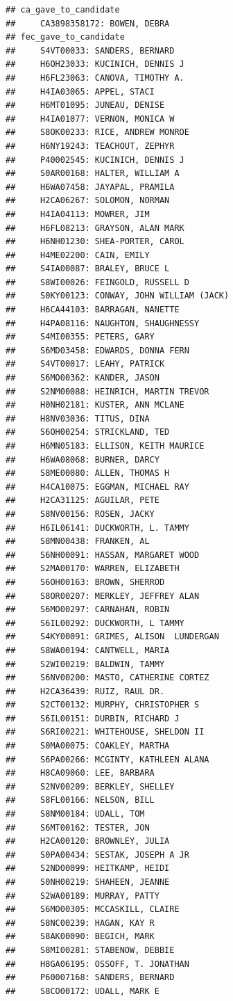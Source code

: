 \documentclass[]{book}
\begin{document}
\begin{verbatim}
## ca_gave_to_candidate 
##     CA3898358172: BOWEN, DEBRA
## fec_gave_to_candidate 
##     S4VT00033: SANDERS, BERNARD
##     H6OH23033: KUCINICH, DENNIS J
##     H6FL23063: CANOVA, TIMOTHY A.
##     H4IA03065: APPEL, STACI
##     H6MT01095: JUNEAU, DENISE
##     H4IA01077: VERNON, MONICA W
##     S8OK00233: RICE, ANDREW MONROE
##     H6NY19243: TEACHOUT, ZEPHYR
##     P40002545: KUCINICH, DENNIS J
##     S0AR00168: HALTER, WILLIAM A
##     H6WA07458: JAYAPAL, PRAMILA
##     H2CA06267: SOLOMON, NORMAN
##     H4IA04113: MOWRER, JIM
##     H6FL08213: GRAYSON, ALAN MARK
##     H6NH01230: SHEA-PORTER, CAROL
##     H4ME02200: CAIN, EMILY
##     S4IA00087: BRALEY, BRUCE L
##     S8WI00026: FEINGOLD, RUSSELL D
##     S0KY00123: CONWAY, JOHN WILLIAM (JACK)
##     H6CA44103: BARRAGAN, NANETTE
##     H4PA08116: NAUGHTON, SHAUGHNESSY
##     S4MI00355: PETERS, GARY
##     S6MD03458: EDWARDS, DONNA FERN
##     S4VT00017: LEAHY, PATRICK
##     S6MO00362: KANDER, JASON
##     S2NM00088: HEINRICH, MARTIN TREVOR
##     H0NH02181: KUSTER, ANN MCLANE
##     H8NV03036: TITUS, DINA
##     S6OH00254: STRICKLAND, TED
##     H6MN05183: ELLISON, KEITH MAURICE
##     H6WA08068: BURNER, DARCY
##     S8ME00080: ALLEN, THOMAS H
##     H4CA10075: EGGMAN, MICHAEL RAY
##     H2CA31125: AGUILAR, PETE
##     S8NV00156: ROSEN, JACKY
##     H6IL06141: DUCKWORTH, L. TAMMY
##     S8MN00438: FRANKEN, AL
##     S6NH00091: HASSAN, MARGARET WOOD
##     S2MA00170: WARREN, ELIZABETH
##     S6OH00163: BROWN, SHERROD
##     S8OR00207: MERKLEY, JEFFREY ALAN
##     S6MO00297: CARNAHAN, ROBIN
##     S6IL00292: DUCKWORTH, L TAMMY
##     S4KY00091: GRIMES, ALISON  LUNDERGAN
##     S8WA00194: CANTWELL, MARIA
##     S2WI00219: BALDWIN, TAMMY
##     S6NV00200: MASTO, CATHERINE CORTEZ
##     H2CA36439: RUIZ, RAUL DR.
##     S2CT00132: MURPHY, CHRISTOPHER S
##     S6IL00151: DURBIN, RICHARD J
##     S6RI00221: WHITEHOUSE, SHELDON II
##     S0MA00075: COAKLEY, MARTHA
##     S6PA00266: MCGINTY, KATHLEEN ALANA
##     H8CA09060: LEE, BARBARA
##     S2NV00209: BERKLEY, SHELLEY
##     S8FL00166: NELSON, BILL
##     S8NM00184: UDALL, TOM
##     S6MT00162: TESTER, JON
##     H2CA00120: BROWNLEY, JULIA
##     S0PA00434: SESTAK, JOSEPH A JR
##     S2ND00099: HEITKAMP, HEIDI
##     S0NH00219: SHAHEEN, JEANNE
##     S2WA00189: MURRAY, PATTY
##     S6MO00305: MCCASKILL, CLAIRE
##     S8NC00239: HAGAN, KAY R
##     S8AK00090: BEGICH, MARK
##     S8MI00281: STABENOW, DEBBIE
##     H8GA06195: OSSOFF, T. JONATHAN
##     P60007168: SANDERS, BERNARD
##     S8CO00172: UDALL, MARK E

\end{verbatim}
\end{document}
